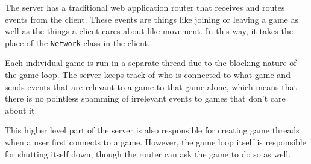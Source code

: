 The server has a traditional web application router that receives and routes events from the client. These events are things like joining or leaving a game as well as the things a client cares about like movement. In this way, it takes the place of the \texttt{Network} class in the client.

Each individual game is run in a separate thread due to the blocking nature of the game loop. The server keeps track of who is connected to what game and sends events that are relevant to a game to that game alone, which means that there is no pointless spamming of irrelevant events to games that don't care about it.

This higher level part of the server is also responsible for creating game threads when a user first connects to a game. However, the game loop itself is responsible for shutting itself down, though the router can ask the game to do so as well.







